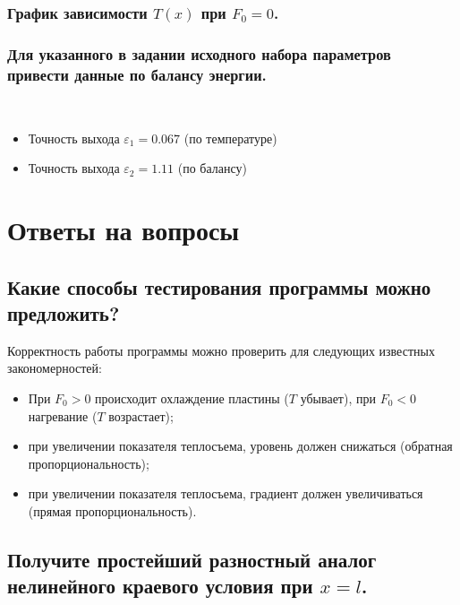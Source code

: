 
\clearpage

\subsection{График зависимости $T(x)$ при $F_{0} = 0$.}


\subsection{Для указанного в задании исходного набора параметров привести данные по балансу энергии.}\\

\begin{itemize}
	\item Точность выхода $\varepsilon_{1} = 0.067$ (по температуре)
	\item Точность выхода $\varepsilon_{2} = 1.11$ (по балансу)
\end{itemize}

\chapter{Ответы на вопросы}

\section{Какие способы тестирования программы можно предложить?}

Корректность работы программы можно проверить для следующих известных закономерностей:
\begin{itemize}
    \item При $F_0 > 0$ происходит охлаждение пластины ($T$ убывает), при $F_0 < 0$ нагревание ($T$ возрастает);
    \item при увеличении показателя теплосъема, уровень должен снижаться (обратная пропорциональность);
    \item при увеличении показателя теплосъема, градиент должен увеличиваться (прямая пропорциональность).
\end{itemize}

\clearpage

\section{Получите простейший разностный аналог нелинейного краевого условия при $x = l$.}

